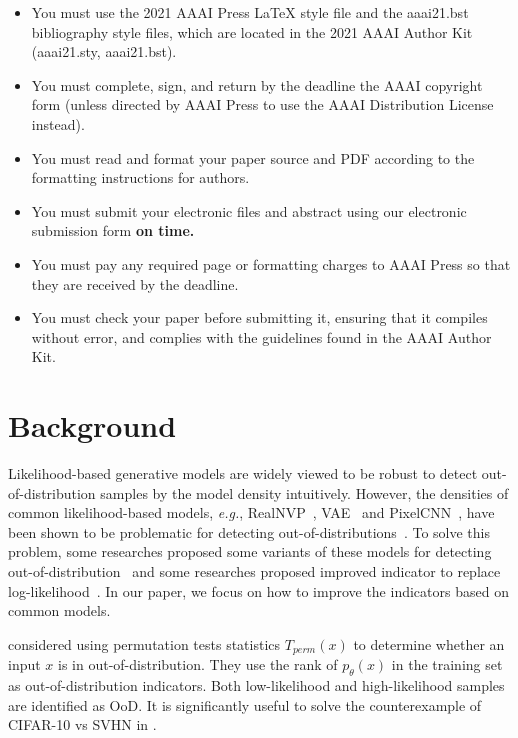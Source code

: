 \documentclass[letterpaper]{article} %
\newcommand{\EG}{\textit{e.g.}, }
\begin{document}
\begin{itemize}
\item You must use the 2021 AAAI Press \LaTeX{} style file and the aaai21.bst bibliography style files, which are located in the 2021 AAAI Author Kit (aaai21.sty, aaai21.bst).
\item You must complete, sign, and return by the deadline the AAAI copyright form (unless directed by AAAI Press to use the AAAI Distribution License instead).
\item You must read and format your paper source and PDF according to the formatting instructions for authors.
\item You must submit your electronic files and abstract using our electronic submission form \textbf{on time.}
\item You must pay any required page or formatting charges to AAAI Press so that they are received by the deadline.
\item You must check your paper before submitting it, ensuring that it compiles without error, and complies with the guidelines found in the AAAI Author Kit.
\end{itemize}

\section{Background}
Likelihood-based generative models are widely viewed to be robust to detect out-of-distribution samples by the model density intuitively. However, the densities of common likelihood-based models, \EG RealNVP~\cite{dinh2016density}, VAE~\cite{tomczak2018vae,takahashi2019variational} and PixelCNN~\cite{van2016conditional}, have been shown to be problematic for detecting out-of-distributions~\cite{nalisnick2018deep}. 
To solve this problem, some researches proposed some variants of these models for detecting out-of-distribution~\cite{che2019deep} and some researches proposed improved indicator to replace log-likelihood~\cite{serra2019input}. In our paper, we focus on how to improve the indicators based on common models. 

\cite{song2017pixeldefend} considered using permutation tests statistics $T_{perm}(x)$ to determine whether an input $x$ is in out-of-distribution. They use the rank of $p_\theta(x)$ in the training set as out-of-distribution indicators. Both low-likelihood and high-likelihood samples are identified as OoD. It is significantly useful to solve the counterexample of CIFAR-10 vs SVHN in \cite{nalisnick2018deep}. 
\end{document}

